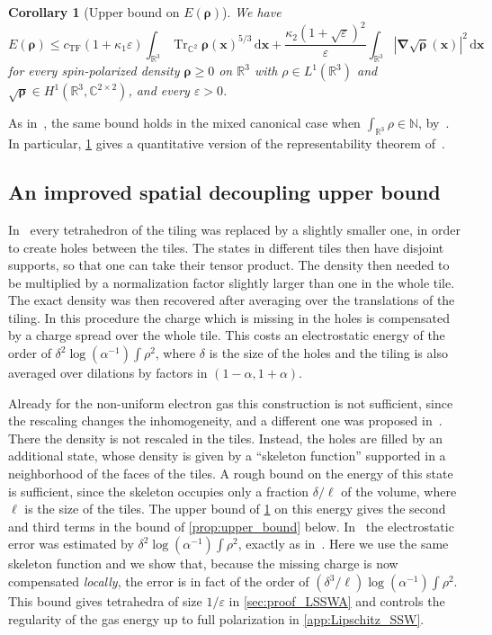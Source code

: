 \documentclass[final,reqno]{amsart}
\newtheorem{corollary}[theorem]{Corollary}
\theoremstyle{remark}
\renewcommand{\le}{\leqslant}
\renewcommand{\ge}{\geqslant}
\renewcommand{\epsilon}{\varepsilon}
\DeclareMathOperator{\Tr}{Tr}
\newcommand{\Trs}{\Tr_{\CC^2}}
\newcommand{\RR}{\mathbb{R}}
\newcommand{\CC}{\mathbb{C}}
\newcommand{\NN}{\mathbb{N}}
\newcommand{\TF}{\mathrm{TF}}
\newcommand{\grad}{\bm{\nabla}}
\newcommand{\dd}{\mathrm{d}}
\begin{document}
\begin{corollary}[Upper bound on $E(\bm{\rho})$]\label{cor:upper_bound_E_rho}
We have
\begin{equation*}
E(\bm{\rho})\le c_\TF(1+\kappa_1\epsilon)\int_{\RR^3} \Trs \bm{\rho}(\mathbf{x})^{5/3}\,\dd \mathbf{x}+\frac{\kappa_2(1+\sqrt\epsilon)^2}{\epsilon}\int_{\RR^3}|\grad\sqrt{\bm{\rho}}(\mathbf{x})|^2\,\dd \mathbf{x}
\end{equation*}
for every spin-polarized density $\bm{\rho}\ge0$ on $\RR^3$ with $\rho\in L^1(\RR^3)$ and $\sqrt{\bm{\rho}}\in H^1(\RR^3,\CC^{2\times2})$, and every $\epsilon>0$.
\end{corollary}

As in~\cite{lewin2020local}, the same bound holds in the mixed canonical case when $\int_{\RR^3}\rho\in\NN$, by~\cite{lieb1981variational}. In particular, \cref{cor:upper_bound_E_rho} gives a quantitative version of the representability theorem of~\cite{gontier2013n}.

\subsection{An improved spatial decoupling upper bound}\label{sec:upper_bound}

In~\cite[Proposition~13]{lewin2020local} every tetrahedron of the tiling was replaced by a slightly smaller one, in order to create holes between the tiles. The states in different tiles then have disjoint supports, so that one can take their tensor product. The density then needed to be multiplied by a normalization factor slightly larger than one in the whole tile. The exact density was then recovered after averaging over the translations of the tiling. In this procedure the charge which is missing in the holes is compensated by a charge spread over the whole tile. This costs an electrostatic energy of the order of $\delta^2\log(\alpha^{-1})\int\rho^2$, where $\delta$ is the size of the holes and the tiling is also averaged over dilations by factors in $(1-\alpha,1+\alpha)$.

Already for the non-uniform electron gas this construction is not sufficient, since the rescaling changes the inhomogeneity, and a different one was proposed in~\cite{csirik2026non}. There the density is not rescaled in the tiles. Instead, the holes are filled by an additional state, whose density is given by a ``skeleton function'' supported in a neighborhood of the faces of the tiles. A rough bound on the energy of this state is sufficient, since the skeleton occupies only a fraction $\delta/\ell$ of the volume, where $\ell$ is the size of the tiles. The upper bound of \cref{cor:upper_bound_E_rho} on this energy gives the second and third terms in the bound of \cref{prop:upper_bound} below. In~\cite{csirik2026non} the electrostatic error was estimated by $\delta^2\log(\alpha^{-1})\int\rho^2$, exactly as in~\cite{lewin2020local}. Here we use the same skeleton function and we show that, because the missing charge is now compensated \emph{locally}, the error is in fact of the order of $(\delta^3/\ell)\log(\alpha^{-1})\int\rho^2$. This bound gives tetrahedra of size $1/\epsilon$ in \cref{sec:proof_LSSWA} and controls the regularity of the gas energy up to full polarization in \cref{app:Lipschitz_SSW}.
\end{document}
